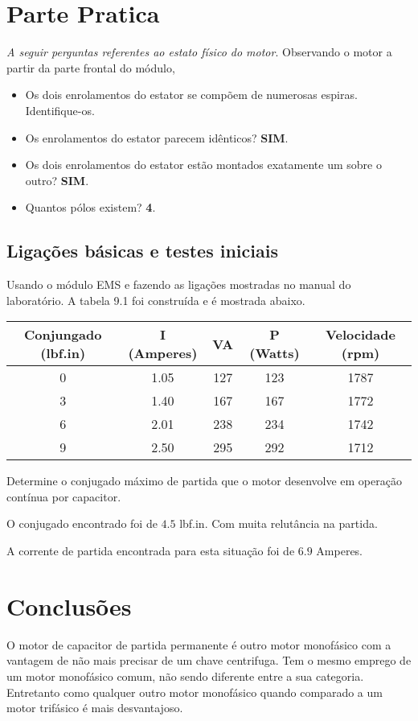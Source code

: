 \documentclass[paper=a4, fontsize=11pt]{article}
\begin{document}
\section{Parte Pratica}

\textit{A seguir perguntas referentes ao estato físico do motor}.
\newline
Observando o motor a partir da parte frontal do módulo, 

\begin{itemize}
        \item Os dois enrolamentos do estator se compõem de numerosas espiras. Identifique-os.
        \item Os enrolamentos do estator parecem idênticos? \textbf{SIM}.
        \item Os dois enrolamentos do estator estão montados exatamente um sobre
                o outro? \textbf{SIM}.
        \item Quantos pólos existem? \textbf{4}.
\end{itemize}

\subsection{Ligações básicas e testes iniciais}

Usando o módulo EMS e fazendo as ligações mostradas no manual 
do laboratório. A tabela 9.1 foi construída e é mostrada abaixo.

\begin{center}
    \begin{tabular}{c|c|c|c|c}
            Conjungado (lbf.in) & I (Amperes) & VA & P (Watts) & Velocidade (rpm) \\
            \hline
            0 & 1.05 & 127 & 123 & 1787 \\
            3 & 1.40 & 167 & 167 & 1772 \\
            6 & 2.01 & 238 & 234 & 1742 \\
            9 & 2.50 & 295 & 292 & 1712 \\
    \end{tabular}
\end{center}

Determine o conjugado máximo de partida que o motor desenvolve em 
operação contínua por capacitor. 

O conjugado encontrado foi de $4.5$ lbf.in. Com muita relutância na
partida.

A corrente de partida encontrada para esta situação foi de $6.9$ Amperes.

\section{Conclusões}

O motor de capacitor de partida permanente é outro motor monofásico
com a vantagem de não mais precisar de um chave centrifuga. Tem o 
mesmo emprego de um motor monofásico comum, não sendo diferente entre
a sua categoria. Entretanto como qualquer outro motor monofásico 
quando comparado a um motor trifásico é mais desvantajoso.
\end{document}
